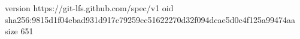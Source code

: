 version https://git-lfs.github.com/spec/v1
oid sha256:9815d1f04ebad931d917c79259cc51622270d32f094dcae5d0c4f125a99474aa
size 651
